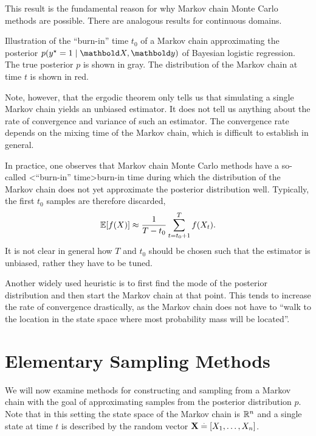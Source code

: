 This result is the fundamental reason for why Markov chain Monte Carlo methods are possible. There are analogous results for continuous domains.

\begin{marginfigure}
  \caption{Illustration of the ``burn-in'' time $t_0$ of a Markov chain approximating the posterior $p(\ys = 1 \mid \mX, \vy)$ of Bayesian logistic regression.
  The true posterior $p$ is shown in gray.
  The distribution of the Markov chain at time $t$ is shown in red.}
\end{marginfigure}

Note, however, that the ergodic theorem only tells us that simulating a single Markov chain yields an unbiased estimator.
It does not tell us anything about the rate of convergence and variance of such an estimator.
The convergence rate depends on the mixing time of the Markov chain, which is difficult to establish in general.

In practice, one observes that Markov chain Monte Carlo methods have a so-called \midx<``burn-in'' time>{burn-in time} during which the distribution of the Markov chain does not yet approximate the posterior distribution well.
Typically, the first $t_0$ samples are therefore discarded, \begin{align}
  \E{f(X)} \approx \frac{1}{T - t_0} \sum_{t=t_0+1}^T f(X_t). \label{eq:mcmc}
\end{align}
It is not clear in general how $T$ and $t_0$ should be chosen such that the estimator is unbiased, rather they have to be tuned.

Another widely used heuristic is to first find the mode of the posterior distribution and then start the Markov chain at that point.
This tends to increase the rate of convergence drastically, as the Markov chain does not have to ``walk to the location in the state space where most probability mass will be located''.

\section{Elementary Sampling Methods}

We will now examine methods for constructing and sampling from a Markov chain with the goal of approximating samples from the posterior distribution $p$.
Note that in this setting the state space of the Markov chain is $\mathbb{R}^n$ and a single state at time $t$ is described by the random vector $\mathbf{X} \overset{.}{=} [X_1, \dots, X_n]$.


